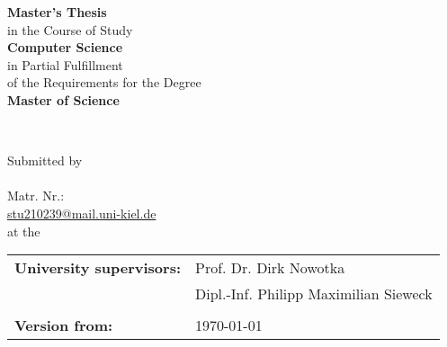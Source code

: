 
\begin{titlepage}

    
    
    
    
    \center
    \LARGE
    \vspace*{0.5cm}
    \textbf{Master's Thesis}\\[0.5cm]
    \large
    in the Course of Study\\
    \textbf{Computer Science}\\
    \vspace*{0.5cm}
    in Partial Fulfillment\\
    of the Requirements for the Degree\\
    \textbf{Master of Science}\\
    \vfill
    
    
    
    \begin{spacing}{2}
        {\huge \bfseries \textbf{\myThesis{}}}\\
    \end{spacing}
    \vfill
    
    
    
    
    Submitted by\\[0.5cm]
    
    \textbf{\myName{}}\\
    Matr. Nr.: \myStudentID{} \\
    \href{mailto:stu210239@mail.uni-kiel.de}{stu210239@mail.uni-kiel.de}\\[0.5cm]
    
    at the \myHochschule{} \\
    
    \vfill
    
    \begin{tabular}{ll}
        \textbf{University supervisors:} & Prof. Dr. Dirk Nowotka                \\
                                         & Dipl.-Inf. Philipp Maximilian Sieweck \\
                                         &                                       \\
        \textbf{Version from: }          & \today                                \\
    \end{tabular}
    
    \vfill
    
\end{titlepage}